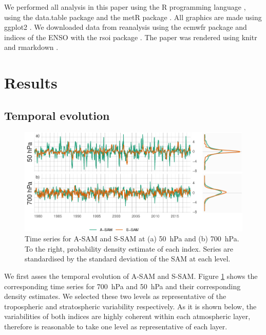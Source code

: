 \documentclass[smallextended]{svjour3}       %
\begin{document}
We performed all analysis in this paper using the R programming language \citep{rcoreteam2020}, using the data.table package \citep{dowle2020} and the metR package \citep{campitelli2020}.
All graphics are made using ggplot2 \citep{wickham2009}.
We downloaded data from reanalysis using the ecmwfr package \citep{hufkens2020} and indices of the ENSO with the rsoi package \citep{albers2020}.
The paper was rendered using knitr and rmarkdown \citep{xie2015, allaire2019}.

\hypertarget{results}{%
\section{Results}\label{results}}

\hypertarget{temporal}{%
\subsection{Temporal evolution}\label{temporal}}

\begin{figure}
\includegraphics{asymsam-timeseries-1} \caption{Time series for A\nobreakdash-SAM and S\nobreakdash-SAM at (a) 50~hPa and (b) 700~hPa. To the right, probability density estimate of each index. Series are standardised by the standard deviation of the SAM at each level.}\label{fig:asymsam-timeseries}
\end{figure}

We first asses the temporal evolution of A\nobreakdash-SAM and S\nobreakdash-SAM.
Figure \ref{fig:asymsam-timeseries} shows the corresponding time series for 700~hPa and 50~hPa and their corresponding density estimates.
We selected these two levels as representative of the tropospheric and stratospheric variability respectively.
As it is shown below, the variabilities of both indices are highly coherent within each atmospheric layer, therefore is reasonable to take one level as representative of each layer.
\end{document}
